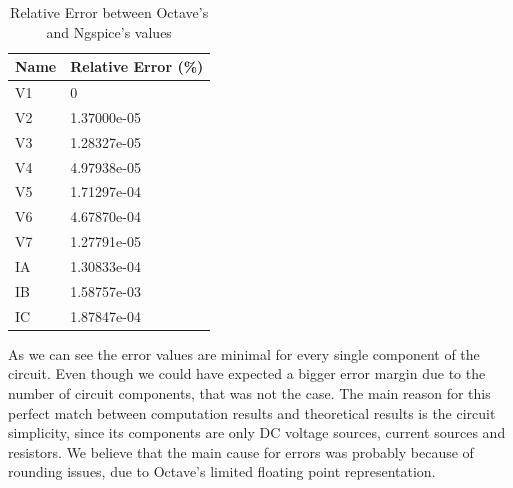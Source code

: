 \documentclass[11en, a4paper, oneside]{article}
\begin{document}
\begin{table}[h]
\begin{center}
\begin{tabular}{|l|l|}
\hline
\textbf{Name}    & \textbf{Relative Error (\%)} \\\hline
V1 & 0           \\\hline
V2 & 1.37000e-05 \\\hline
V3 & 1.28327e-05 \\\hline
V4 & 4.97938e-05 \\\hline
V5 & 1.71297e-04 \\\hline
V6 & 4.67870e-04 \\\hline
V7 & 1.27791e-05 \\\hline
IA & 1.30833e-04 \\\hline
IB & 1.58757e-03 \\\hline
IC & 1.87847e-04 \\\hline
\end{tabular}
\caption{Relative Error between Octave's and Ngspice's values}
\end{center}
\end{table}

As we can see the error values are minimal for every single component of the circuit. Even though we could have expected a bigger error margin due to the number of circuit components, that was not the case. The main reason for this perfect match between computation results and theoretical results is the circuit simplicity, since its components are only DC voltage sources, current sources and resistors. We believe that the main cause for errors was probably because of rounding issues, due to Octave's limited floating point representation.
\end{document}
